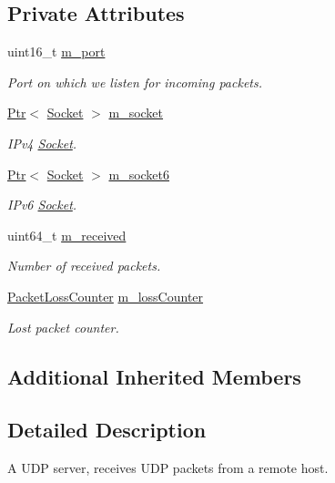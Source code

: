 \subsection*{Private Attributes}
\begin{DoxyCompactItemize}
\item 
uint16\+\_\+t \hyperlink{classns3_1_1UdpServer_a2b8a2fdb49222a11c987c346cb84e5ee}{m\+\_\+port}
\begin{DoxyCompactList}\small\item\em Port on which we listen for incoming packets. \end{DoxyCompactList}\item 
\hyperlink{classns3_1_1Ptr}{Ptr}$<$ \hyperlink{classns3_1_1Socket}{Socket} $>$ \hyperlink{classns3_1_1UdpServer_a5420784fc2d236829a7ccec205fe09fc}{m\+\_\+socket}
\begin{DoxyCompactList}\small\item\em I\+Pv4 \hyperlink{classns3_1_1Socket}{Socket}. \end{DoxyCompactList}\item 
\hyperlink{classns3_1_1Ptr}{Ptr}$<$ \hyperlink{classns3_1_1Socket}{Socket} $>$ \hyperlink{classns3_1_1UdpServer_a08570b8278b2cf8a0b02a40bbae1dc79}{m\+\_\+socket6}
\begin{DoxyCompactList}\small\item\em I\+Pv6 \hyperlink{classns3_1_1Socket}{Socket}. \end{DoxyCompactList}\item 
uint64\+\_\+t \hyperlink{classns3_1_1UdpServer_ac4e5a1da93444bc7b0a8bcdf66337518}{m\+\_\+received}
\begin{DoxyCompactList}\small\item\em Number of received packets. \end{DoxyCompactList}\item 
\hyperlink{classns3_1_1PacketLossCounter}{Packet\+Loss\+Counter} \hyperlink{classns3_1_1UdpServer_a8b6e5ac841368b11e9458045fc4896b0}{m\+\_\+loss\+Counter}
\begin{DoxyCompactList}\small\item\em Lost packet counter. \end{DoxyCompactList}\end{DoxyCompactItemize}
\subsection*{Additional Inherited Members}


\subsection{Detailed Description}
A U\+DP server, receives U\+DP packets from a remote host. 

